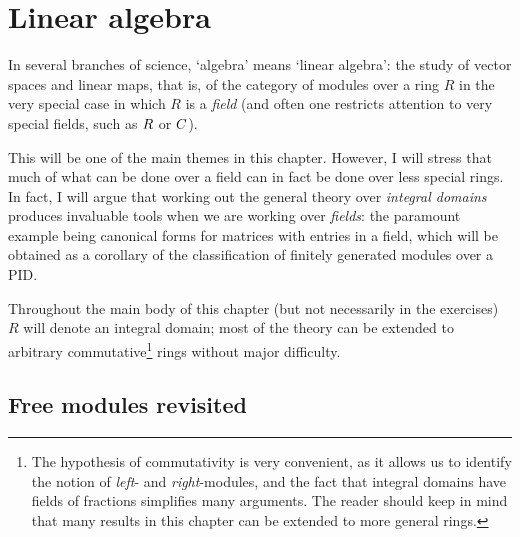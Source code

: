 \chapter{Linear algebra}
\label{chap:linalg}

In several branches of science, `algebra' means `linear algebra': the
study of vector spaces and linear maps, that is, of the category of
modules over a ring $R$ in the very special case in which $R$ is a
\emph{field} (and often one restricts attention to very special
fields, such as $R$ or $C$).

This will be one of the main themes in this chapter. However, I will
stress that much of what can be done over a field can in fact be done
over less special rings. In fact, I will argue that working out the
general theory over \emph{integral domains} produces invaluable tools
when we are working over \emph{fields}: the paramount example being
canonical forms for matrices with entries in a field, which will be
obtained as a corollary of the classification of finitely generated
modules over a PID.

Throughout the main body of this chapter (but not necessarily in the
exercises) $R$ will denote an integral domain; most of the theory can
be extended to arbitrary commutative\footnote{The hypothesis of
  commutativity is very convenient, as it allows us to identify the
  notion of \emph{left}- and \emph{right}-modules, and the fact that
  integral domains have fields of fractions simplifies many
  arguments. The reader should keep in mind that many results in this
  chapter can be extended to more general rings.} rings without major
difficulty.

\section{Free modules revisited}
\label{sec:linalg:free-modules-revisited}


